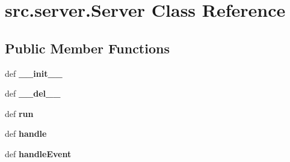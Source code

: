 \hypertarget{classsrc_1_1server_1_1_server}{\section{src.\-server.\-Server \-Class \-Reference}
\label{classsrc_1_1server_1_1_server}
}
\subsection*{\-Public \-Member \-Functions}
\begin{DoxyCompactItemize}
\item 
\hypertarget{classsrc_1_1server_1_1_server_ab52a728bb84ab6a81221c7449138e807}{def {\bfseries \-\_\-\-\_\-init\-\_\-\-\_\-}}\label{classsrc_1_1server_1_1_server_ab52a728bb84ab6a81221c7449138e807}

\item 
\hypertarget{classsrc_1_1server_1_1_server_a5b0212f18c14f58e2abb8c84a789bf2d}{def {\bfseries \-\_\-\-\_\-del\-\_\-\-\_\-}}\label{classsrc_1_1server_1_1_server_a5b0212f18c14f58e2abb8c84a789bf2d}

\item 
\hypertarget{classsrc_1_1server_1_1_server_a592d0980afabc0575c7e099629fdfb73}{def {\bfseries run}}\label{classsrc_1_1server_1_1_server_a592d0980afabc0575c7e099629fdfb73}

\item 
\hypertarget{classsrc_1_1server_1_1_server_afb233810d3cb05ef6847e11f5b09143e}{def {\bfseries handle}}\label{classsrc_1_1server_1_1_server_afb233810d3cb05ef6847e11f5b09143e}

\item 
\hypertarget{classsrc_1_1server_1_1_server_a6b2455f4bf58450a16cdaa2dda1d1c25}{def {\bfseries handle\-Event}}\label{classsrc_1_1server_1_1_server_a6b2455f4bf58450a16cdaa2dda1d1c25}

\end{DoxyCompactItemize}
